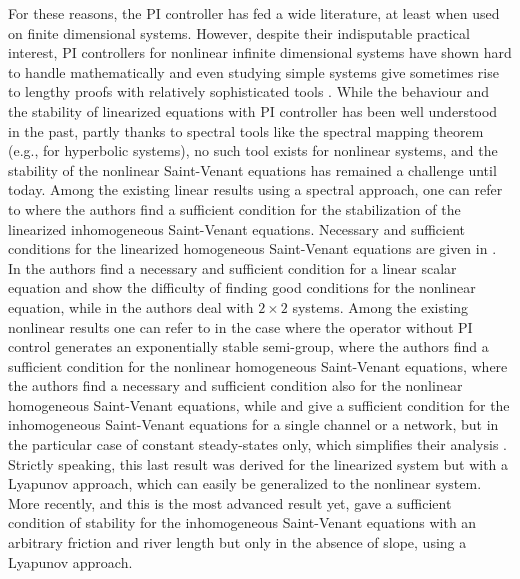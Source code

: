 \documentclass[11pt]{article}
\newcommand{\eg}{e.g.,\xspace}
\numberwithin{equation}{section}
\theoremstyle{definition}
\begin{document}
For these reasons, the PI controller has fed a wide literature, at least when used on finite dimensional systems.
However, despite their indisputable practical interest, PI controllers for nonlinear infinite dimensional systems have shown hard to handle mathematically
and even studying simple systems give sometimes rise to lengthy proofs with relatively sophisticated tools \cite{PItransport}.
While the behaviour and the stability of linearized equations
with PI controller
has been well understood in the past, partly thanks to spectral tools like the spectral mapping theorem (\eg \cite{Neves,Lichtner} for hyperbolic systems), no such {tool exists} for nonlinear systems, and
the stability of the nonlinear Saint-Venant equations has remained a challenge until today.
{Among the existing linear results using a spectral approach, one can refer to \cite{XuSallet,XuSallet2014} where the authors find a sufficient condition for the stabilization of the linearized inhomogeneous Saint-Venant equations.
Necessary and sufficient conditions for the linearized homogeneous Saint-Venant equations
are given in \cite[\S\S 2.2.4.1,\,3.4.4]{BastinCoron1D}.
In \cite{CoronTamasoiu2015} the authors find a necessary and sufficient condition for a linear scalar equation and show the difficulty of finding good conditions for the nonlinear equation, while
in \cite{BastinCoronTamasoiu2015} the authors deal with $2\times2$ systems.}
Among the existing nonlinear results
{one can refer to {\cite{TerrandAndrieuDos} in the case where the operator without PI control generates an exponentially stable semi-group},
\cite{Trinh2015} where the authors find a sufficient condition for the nonlinear homogeneous Saint-Venant equations,
\cite[2.2.4.2]{BastinCoron1D} where the authors find a necessary and sufficient condition also for the
nonlinear homogeneous Saint-Venant equations,
while
\cite[\S\S 5.4.4,\,5.5]{BastinCoron1D} and \cite{BastinCoron2013} give a sufficient condition for the inhomogeneous Saint-Venant equations for a single channel or a network,
but in the particular case of constant steady-states only, which simplifies their analysis \cite{C1}. Strictly speaking, this last result was derived for the linearized system
but with a Lyapunov approach, which can easily be generalized to the nonlinear system.}
More recently, and this is the most advanced result yet, \cite{BastinCoronPI} gave a sufficient condition of stability for the inhomogeneous Saint-Venant equations with an arbitrary friction and river length but only
in the absence of slope, using a Lyapunov approach.
\end{document}
